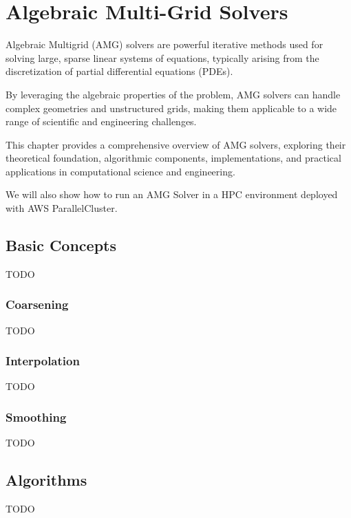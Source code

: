 

\chapter{Algebraic Multi-Grid Solvers}

Algebraic Multigrid (AMG) solvers are powerful iterative methods used for solving large, sparse linear systems of equations, typically arising from the discretization of partial differential equations (PDEs).

By leveraging the algebraic properties of the problem, AMG solvers can handle complex geometries and unstructured grids, making them applicable to a wide range of scientific and engineering challenges.

This chapter provides a comprehensive overview of AMG solvers, exploring their theoretical foundation, algorithmic components, implementations, and practical applications in computational science and engineering. 

We will also show how to run an AMG Solver in a HPC environment deployed with AWS ParallelCluster.

\section{Basic Concepts}

TODO

\subsection{Coarsening}

TODO

\subsection{Interpolation}

TODO

\subsection{Smoothing}

TODO

\section{Algorithms}

TODO

